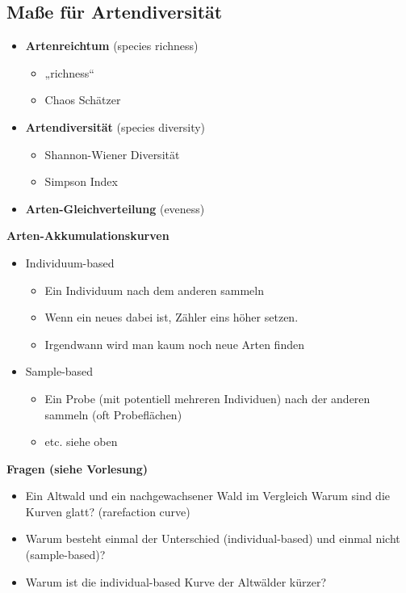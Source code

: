 \subsection{Maße für Artendiversität}
\begin{itemize}
	\item \textbf{Artenreichtum} (species richness)
	\begin{itemize}
		\item „richness“
		\item Chaos Schätzer
	\end{itemize}
	\item \textbf{Artendiversität} (species diversity)
	\begin{itemize}
		\item Shannon-Wiener Diversität
		\item Simpson Index
	\end{itemize}
	\item \textbf{Arten-Gleichverteilung} (eveness)
\end{itemize}

\newpage
\textbf{Arten-Akkumulationskurven}
\begin{itemize}
	\item Individuum-based
	\begin{itemize}
		\item Ein Individuum nach dem anderen sammeln
		\item Wenn ein neues dabei ist, Zähler eins höher setzen.
		\item Irgendwann wird man kaum noch neue Arten finden
	\end{itemize}
	\item Sample-based
	\begin{itemize}
		\item Ein Probe (mit potentiell mehreren Individuen) nach der anderen sammeln (oft Probeflächen)
		\item etc. siehe oben
	\end{itemize}
\end{itemize}

\textbf{Fragen (siehe Vorlesung)}
\begin{itemize}
	\item Ein Altwald und ein nachgewachsener Wald im Vergleich Warum sind die Kurven glatt? (rarefaction curve)
	\item Warum besteht einmal der Unterschied (individual-based) und einmal nicht (sample-based)?
	\item Warum ist die individual-based Kurve der Altwälder kürzer?
\end{itemize}
